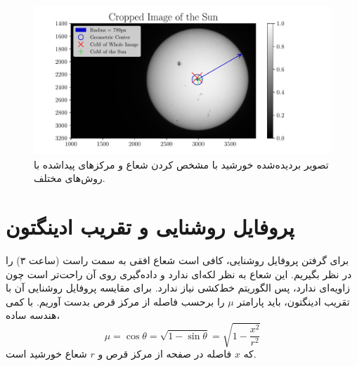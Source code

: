 \documentclass[12pt,a4paper]{article}
\begin{document}
	\begin{figure}
		\centering
		\includegraphics[width=\linewidth]{../fig/sun}
		\caption{تصویر بردیده‌شده خورشید با مشخص کردن شعاع و مرکزهای پیداشده با روش‌های مختلف.}
	\end{figure}
	
	\section{پروفایل روشنایی و تقریب ادینگتون}
	برای گرفتن پروفایل روشنایی، کافی است شعاع افقی به سمت راست (ساعت ۳) را در نظر بگیریم. این شعاع به نظر لکه‌ای ندارد
	و داده‌گیری روی آن راحت‌تر است چون زاویه‌ای ندارد، پس الگوریتم خط‌کشی نیاز ندارد. برای مقایسه پروفایل روشنایی آن با
	تقریب ادینگتون، باید پارامتر $\mu$ را برحسب فاصله از مرکز قرص بدست آوریم. با کمی هندسه ساده،
	\begin{equation}
		\mu = \cos{\theta} = \sqrt{1-\sin{\theta}} = \sqrt{1-\frac{x^2}{r^2}}
	\end{equation}
	که $x$ فاصله در صفحه از مرکز قرص و $r$ شعاع خورشید است.
	
\end{document}
